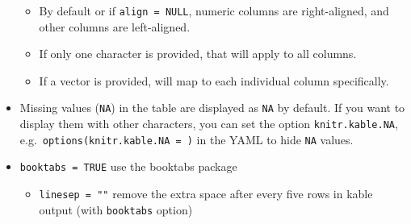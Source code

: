 \documentclass[
  a4paper,
  twoside,
  openright]{book}
\providecommand{\tightlist}{%
  \setlength{\itemsep}{0pt}\setlength{\parskip}{0pt}}
\theoremstyle{definition}
\theoremstyle{definition}
\theoremstyle{definition}
\theoremstyle{definition}
\theoremstyle{remark}
\begin{document}
\begin{itemize}
  \begin{itemize}
  \tightlist
  \item
    By default or if \texttt{align\ =\ NULL}, {numeric columns are right-aligned}, and {other columns are left-aligned}.
  \item
    If only one character is provided, that will apply to all columns.
  \item
    If a vector is provided, will map to each individual column specifically.
  \end{itemize}
\item
  Missing values (\texttt{NA}) in the table are displayed as \texttt{NA} by default. If you want to display them with other characters, you can set the option \texttt{knitr.kable.NA}, e.g.~{\texttt{options(knitr.kable.NA\ =\ \textquotesingle{}\textquotesingle{})}} in the YAML to hide \texttt{NA} values.
\item
  {\texttt{booktabs\ =\ TRUE}} use the booktabs package

  \begin{itemize}
  \tightlist
  \item
    \texttt{linesep\ =\ ""} remove the extra space after every five rows in kable output (with \texttt{booktabs} option)
  \end{itemize}
\end{itemize}
\end{document}
